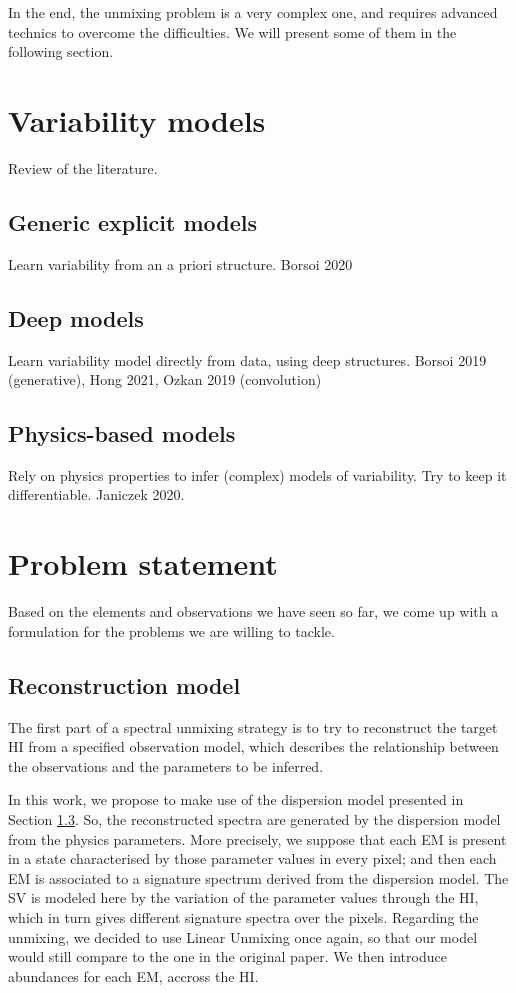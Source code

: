 \documentclass{article}
\begin{document}
In the end, the unmixing problem is a very complex one, and requires advanced technics to overcome the difficulties. We will present some of them in the following section.

\section{Variability models}
Review of the literature.

\subsection{Generic explicit models}
Learn variability from an a priori structure. Borsoi 2020

\subsection{Deep models}
Learn variability model directly from data, using deep structures. Borsoi 2019 (generative), Hong 2021, Ozkan 2019 (convolution)

\subsection{Physics-based models}\label{sec:dispersion}
Rely on physics properties to infer (complex) models of variability. Try to keep it differentiable. Janiczek 2020.


\section{Problem statement}
Based on the elements and observations we have seen so far, we come up with a formulation for the problems we are willing to tackle.

\subsection{Reconstruction model}
The first part of a spectral unmixing strategy is to try to reconstruct the target HI from a specified observation model, which describes the relationship between the observations and the parameters to be inferred.

In this work, we propose to make use of the dispersion model presented in Section \ref{sec:dispersion}. So, the reconstructed spectra are generated by the dispersion model from the physics parameters. More precisely, we suppose that each EM is present in a state characterised by those parameter values in every pixel; and then each EM is associated to a signature spectrum derived from the dispersion model. The SV is modeled here by the variation of the parameter values through the HI, which in turn gives different signature spectra over the pixels. Regarding the unmixing, we decided to use Linear Unmixing once again, so that our model would still compare to the one in the original paper. We then introduce abundances for each EM, accross the HI.
\end{document}
